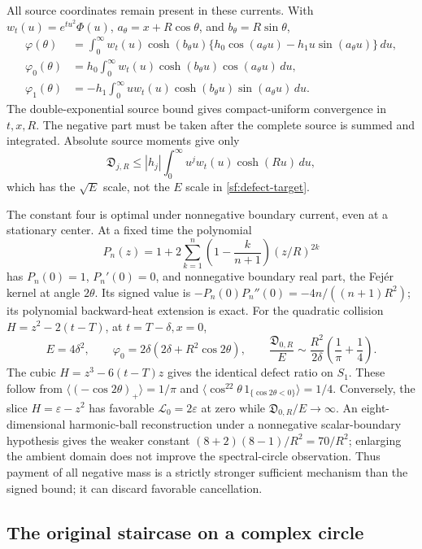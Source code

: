 \documentclass[11pt]{article}
\numberwithin{equation}{section}
\theoremstyle{definition}
\theoremstyle{remark}
\newcommand{\dd}{\,d}
\newcommand{\Lag}{\mathcal L}
\begin{document}
All source coordinates remain present in these currents.  With
\(w_t(u)=e^{tu^2}\Phi(u)\), \(a_\theta=x+R\cos\theta\), and
\(b_\theta=R\sin\theta\),
\begin{align}
 \varphi(\theta)&=\int_0^\infty w_t(u)\cosh(b_\theta u)
       \{h_0\cos(a_\theta u)-h_1u\sin(a_\theta u)\}\dd u,
       \label{sf:source-current}\\
 \varphi_0(\theta)&=h_0\int_0^\infty w_t(u)
                   \cosh(b_\theta u)\cos(a_\theta u)\dd u,\nonumber\\
 \varphi_1(\theta)&=-h_1\int_0^\infty u w_t(u)
                   \cosh(b_\theta u)\sin(a_\theta u)\dd u.\nonumber
\end{align}
The double-exponential source bound gives compact-uniform convergence
in \(t,x,R\).  The negative part must be taken after the complete source
is summed and integrated.  Absolute source moments give only
\[
 \mathfrak D_{j,R}\le |h_j|
       \int_0^\infty u^j w_t(u)\cosh(Ru)\dd u,
\]
which has the \(\sqrt E\) scale, not the \(E\) scale in
\eqref{sf:defect-target}.

The constant four is optimal under nonnegative boundary current, even
at a stationary center.  At a fixed time the polynomial
\[
 P_n(z)=1+2\sum_{k=1}^n\left(1-\frac{k}{n+1}\right)(z/R)^{2k}
\]
has \(P_n(0)=1\), \(P_n'(0)=0\), and nonnegative boundary real part,
the Fej\'er kernel at angle \(2\theta\).  Its signed value is
\(-P_n(0)P_n''(0)=-4n/((n+1)R^2)\); its polynomial backward-heat
extension is exact.  For the quadratic collision
\(H=z^2-2(t-T)\), at \(t=T-\delta,x=0\),
\[
 E=4\delta^2,\qquad
 \varphi_0=2\delta(2\delta+R^2\cos2\theta),\qquad
 \frac{\mathfrak D_{0,R}}E\sim
 \frac{R^2}{2\delta}\left(\frac1\pi+\frac14\right).
\]
The cubic \(H=z^3-6(t-T)z\) gives the identical defect ratio on
\(S_1\).  These follow from
\(\langle(-\cos2\theta)_+\rangle=1/\pi\) and
\(\langle\cos^22\theta\,1_{\{\cos2\theta<0\}}\rangle=1/4\).
Conversely, the slice \(H=\varepsilon-z^2\) has favorable
\(\Lag_0=2\varepsilon\) at zero while
\(\mathfrak D_{0,R}/E\to\infty\).  An eight-dimensional harmonic-ball reconstruction under a nonnegative
scalar-boundary hypothesis gives the weaker constant
\((8+2)(8-1)/R^2=70/R^2\); enlarging the ambient domain does not
improve the spectral-circle observation.  Thus payment of all negative mass
is a strictly stronger sufficient mechanism than the signed bound;
it can discard favorable cancellation.

\subsection{The original staircase on a complex circle}
\end{document}

